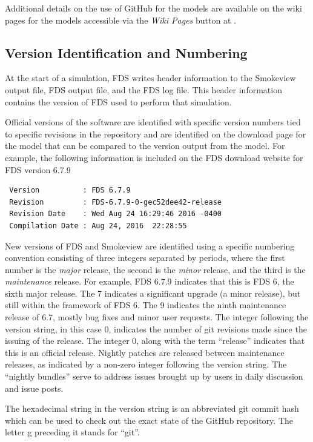 \documentclass[11pt]{book}
\begin{document}
Additional details on the use of GitHub for the models are available on the wiki pages for the models accessible via the \emph{Wiki Pages} button at \href{https://pages.nist.gov/fds-smv} {}.

\subsection{Version Identification and Numbering}

At the start of a simulation, FDS writes header information to the Smokeview output file, FDS output file, and the FDS log file.  This header information contains the version of FDS used to perform that simulation.

Official versions of the software are identified with specific version numbers tied to specific revisions in the repository and are identified on the download page for the model that can be compared to the version output from the model. For example, the following information is included on the FDS download website for FDS version 6.7.9
\begin{lstlisting}
 Version          : FDS 6.7.9
 Revision         : FDS-6.7.9-0-gec52dee42-release
 Revision Date    : Wed Aug 24 16:29:46 2016 -0400
 Compilation Date : Aug 24, 2016  22:28:55
\end{lstlisting}
New versions of FDS and Smokeview are identified using a specific numbering convention consisting of three integers separated by periods, where the first number is the {\em major} release, the second is the {\em minor} release, and the third is the {\em maintenance} release. For example, FDS 6.7.9 indicates that this is FDS 6, the sixth major release. The 7 indicates a significant upgrade (a minor release), but still within the framework of FDS 6.  The 9 indicates the ninth maintenance release of 6.7, mostly bug fixes and minor user requests. The integer following the version string, in this case 0, indicates the number of git revisions made since the issuing of the release. The integer 0, along with the term ``release'' indicates that this is an official release. Nightly patches are released between maintenance releases, as indicated by a non-zero integer following the version string. The ``nightly bundles'' serve to address issues brought up by users in daily discussion and issue posts.

The hexadecimal string  in the version string is an abbreviated git commit hash which can be used to check out the exact state of the GitHub repository. The letter {\ct g} preceding it stands for ``git''.
\end{document}

